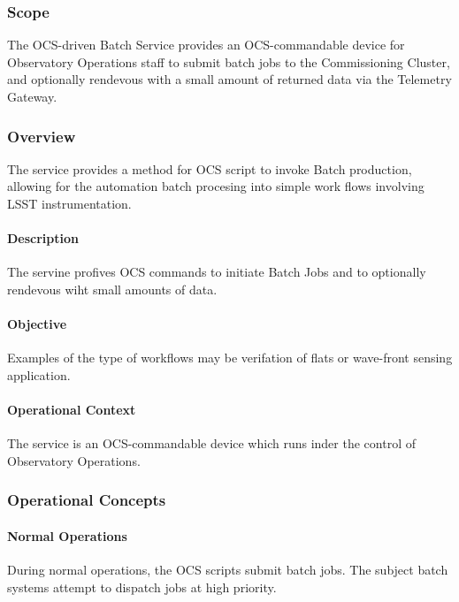 \subsubsection{Scope}

The OCS-driven Batch Service provides an OCS-commandable device for Observatory
Operations staff to submit batch jobs to the Commissioning Cluster, and optionally rendevous
with a small amount of returned data via the Telemetry Gateway.

\subsubsection{Overview}

The service provides a method for OCS script to invoke Batch
production, allowing for the automation batch procesing into simple work
flows involving LSST instrumentation.


\paragraph{Description}

The servine profives OCS commands to initiate Batch Jobs and to optionally
rendevous wiht small amounts of data.

\paragraph{Objective}

Examples of the type of workflows may be verifation of flats or wave-front sensing
application.


\paragraph{Operational Context}

The service is an OCS-commandable device which runs inder the control of
Observatory  Operations.

\subsubsection{Operational Concepts}

\paragraph{Normal Operations}

During normal operations, the OCS scripts submit batch jobs. The subject batch systems attempt to dispatch jobs at high priority.

